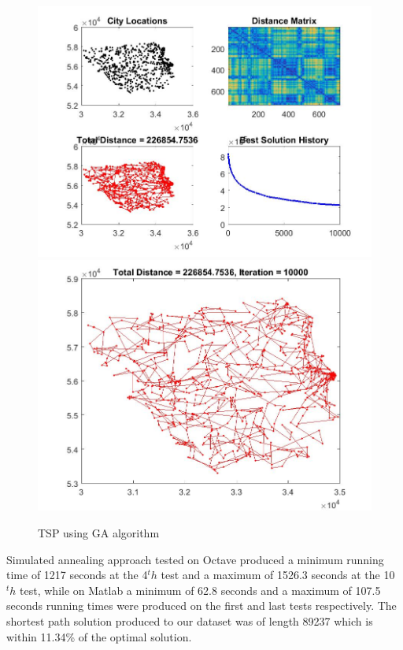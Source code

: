 \documentclass[twocolumn]{article}
\begin{document}
	\begin{figure}[h!]
		\centering
		\includegraphics[scale=0.25]{./GA1.jpg}
		\includegraphics[scale=0.25]{./GA2.jpg}
		\caption{TSP using GA algorithm}
		\label{fig:GAalgorithm}
	\end{figure}
	
	Simulated annealing approach tested on Octave produced a minimum running time of 1217 seconds at the 4$^th$ test and a maximum of 1526.3 seconds at the 10$^th$ test, while on Matlab a minimum of 62.8 seconds and a maximum of 107.5 seconds running times were produced on the first and last tests respectively. The shortest path solution produced to our dataset was of length 89237 which is within 11.34\% of the optimal solution.
	
\end{document}
